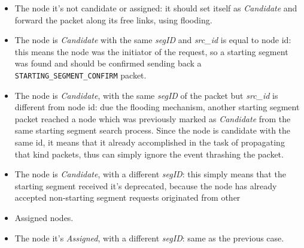 \begin{itemize}
\item The node it's not candidate or assigned: it should set itself as
\emph{Candidate} and forward the packet along its free links, using
flooding.  
\item The node is \emph{Candidate} with the same
\emph{segID} and \emph{src\_id} is equal to node id: this means the
node was the initiator of the request, so a starting segment was found and
should be confirmed sending back a \texttt{STARTING\_SEGMENT\_CONFIRM}
packet.  
\item The node is \emph{Candidate}, with the same \emph{segID} of the
packet but \emph{src\_id} is different from node id: due
the flooding mechanism, another starting segment packet reached a node
which was previously marked as \emph{Candidate} from the same starting segment
search process. Since the node is candidate with the same id, it means
that it already accomplished in the task of propagating that kind
packets, thus can simply ignore the event thrashing the packet.  
\item The node is \emph{Candidate}, with a different \emph{segID}: 
this simply means that the starting segment received it's deprecated,
because the node has already accepted non-starting segment requests
originated from other \item{Assigned} nodes.
\item The node it's \emph{Assigned}, with a different \emph{segID}:
same as the previous case. 


\end{itemize}

